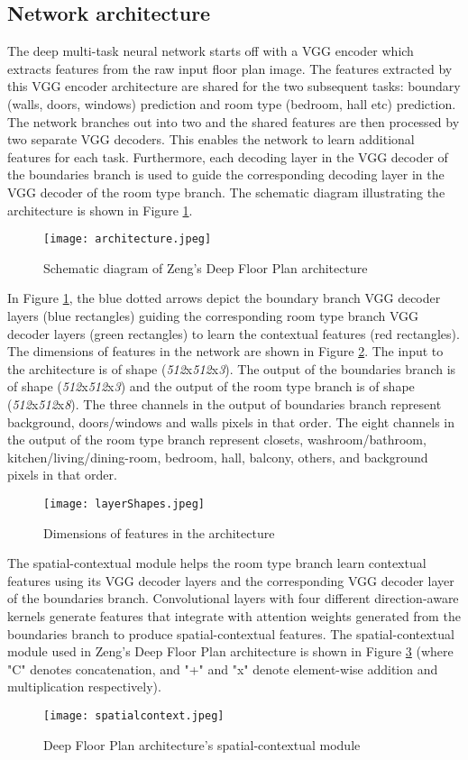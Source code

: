 \documentclass[a4paper]{article}
\begin{document}
\subsection{Network architecture}
The deep multi-task neural network starts off with a VGG encoder which extracts features from the raw input floor plan image. The features extracted by this VGG encoder architecture are shared for the two subsequent tasks: boundary (walls, doors, windows) prediction and room type (bedroom, hall etc) prediction. The network branches out into two and the shared features are then processed by two separate VGG decoders. This enables the network to learn additional features for each task. Furthermore, each decoding layer in the VGG decoder of the boundaries branch is used to guide the corresponding decoding layer in the VGG decoder of the room type branch. The schematic diagram illustrating the architecture is shown in Figure \ref{archDiag}.
\begin{figure}[H]
    \centering
    \texttt{[image: architecture.jpeg]}
    \caption{Schematic diagram of Zeng's Deep Floor Plan architecture}
    \label{archDiag}
\end{figure}
In Figure \ref{archDiag}, the blue dotted arrows depict the boundary branch VGG decoder layers (blue rectangles) guiding the corresponding room type branch VGG decoder layers (green rectangles) to learn the contextual features (red rectangles). 
The dimensions of features in the network are shown in Figure \ref{layershapes}. The input to the architecture is of shape (\textit{512}x\textit{512}x\textit{3}). The output of the boundaries branch is of shape (\textit{512}x\textit{512}x\textit{3}) and the output of the room type branch is of shape (\textit{512}x\textit{512}x\textit{8}). The three channels in the output of boundaries branch represent background, doors/windows and walls pixels in that order. The eight channels in the output of the room type branch represent closets, washroom/bathroom, kitchen/living/dining-room, bedroom, hall, balcony, others, and background pixels in that order.
\begin{figure}[H]
    \centering
    \texttt{[image: layerShapes.jpeg]}
    \caption{Dimensions of features in the architecture}
    \label{layershapes}
\end{figure}
The spatial-contextual module helps the room type branch learn contextual features using its VGG decoder layers and the corresponding VGG decoder layer of the boundaries branch. Convolutional layers with four different direction-aware kernels generate features that integrate with attention weights generated from the boundaries branch to produce spatial-contextual features. 
The spatial-contextual module used in Zeng's Deep Floor Plan architecture is shown in Figure \ref{SCM} (where "C" denotes concatenation, and "+" and "x" denote element-wise addition and multiplication respectively). 
\begin{figure}[H]
    \centering
    \texttt{[image: spatialcontext.jpeg]}
    \caption{Deep Floor Plan architecture's spatial-contextual module}
    \label{SCM}
\end{figure}
\end{document}
